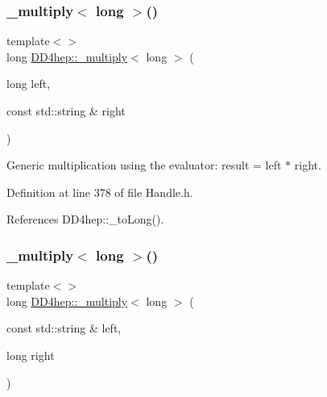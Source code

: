 \subsubsection{\texorpdfstring{\+\_\+multiply$<$ long $>$()}{\_multiply< long >()}\hspace{0.1cm}{\footnotesize\ttfamily [2/3]}}
{\footnotesize\ttfamily template$<$$>$ \\
long \hyperlink{group___d_d4_h_e_p___g_e_o_m_e_t_r_y_gab860c2299e2eb50e537c5079fb0c9c51}{D\+D4hep\+::\+\_\+multiply}$<$ long $>$ (\begin{DoxyParamCaption}\item[{long}]{left,  }\item[{const std\+::string \&}]{right }\end{DoxyParamCaption})\hspace{0.3cm}{\ttfamily [inline]}}



Generic multiplication using the evaluator\+: result = left $\ast$ right. 



Definition at line 378 of file Handle.\+h.



References D\+D4hep\+::\+\_\+to\+Long().

\hypertarget{group___d_d4_h_e_p___g_e_o_m_e_t_r_y_ga5e0bf4f3311767d1f9a12d4e253f0ac3}{}\label{group___d_d4_h_e_p___g_e_o_m_e_t_r_y_ga5e0bf4f3311767d1f9a12d4e253f0ac3} 
\subsubsection{\texorpdfstring{\+\_\+multiply$<$ long $>$()}{\_multiply< long >()}\hspace{0.1cm}{\footnotesize\ttfamily [3/3]}}
{\footnotesize\ttfamily template$<$$>$ \\
long \hyperlink{group___d_d4_h_e_p___g_e_o_m_e_t_r_y_gab860c2299e2eb50e537c5079fb0c9c51}{D\+D4hep\+::\+\_\+multiply}$<$ long $>$ (\begin{DoxyParamCaption}\item[{const std\+::string \&}]{left,  }\item[{long}]{right }\end{DoxyParamCaption})\hspace{0.3cm}{\ttfamily [inline]}}



